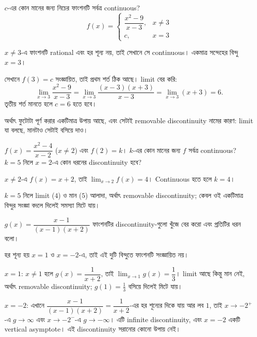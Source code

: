 \documentclass[11pt]{article}
\begin{document}
\begin{example}
$c$-এর কোন মানের জন্য নিচের ফাংশনটি সর্বত্র continuous?
\[
  f(x) = \begin{cases}
    \dfrac{x^{2}-9}{x-3}, & x \neq 3 \\[2mm]
    c, & x = 3
  \end{cases}
\]
\end{example}

\begin{solbox}
$x \neq 3$-এ ফাংশনটি rational এবং হর শূন্য নয়, তাই সেখানে সে continuous।
একমাত্র সন্দেহের বিন্দু $x = 3$।

সেখানে $f(3) = c$ সংজ্ঞায়িত, তাই প্রথম শর্ত ঠিক আছে। limit বের করি:
\[
  \lim_{x \to 3} \frac{x^{2}-9}{x-3}
  = \lim_{x \to 3} \frac{(x-3)(x+3)}{x-3}
  = \lim_{x \to 3} (x+3) = 6 .
\]
তৃতীয় শর্ত মানতে হলে $c = 6$ হতে হবে।

অর্থাৎ ফুটোটা পূর্ণ করার একটিমাত্র উপায় আছে, এবং সেটাই removable discontinuity
নামের কারণ: limit যা বলছে, মানটাও সেটাই বসিয়ে দাও।
\end{solbox}

 $f(x) = \dfrac{x^{2}-4}{x-2}$ ($x \neq 2$) এবং $f(2) = k$। $k$-এর কোন
মানের জন্য $f$ সর্বত্র continuous? $k = 5$ নিলে $x=2$-এ কোন ধরনের
discontinuity হবে?

\begin{sol}
$x \neq 2$-এ $f(x) = x+2$, তাই $\lim_{x \to 2} f(x) = 4$। Continuous হতে হলে
$k = 4$।

$k = 5$ নিলে limit ($4$) ও মান ($5$) আলাদা, অর্থাৎ removable discontinuity;
কেবল ওই একটিমাত্র বিন্দুর সংজ্ঞা বদলে দিলেই সমস্যা মিটে যায়।
\end{sol}

 $g(x) = \dfrac{x-1}{(x-1)(x+2)}$ ফাংশনটির discontinuity-গুলো খুঁজে বের
করো এবং প্রতিটির ধরন বলো।

\begin{sol}
হর শূন্য হয় $x = 1$ ও $x = -2$-এ, তাই এই দুটি বিন্দুতে ফাংশনটি সংজ্ঞায়িত নয়।

$x = 1$: $x \neq 1$ হলে $g(x) = \dfrac{1}{x+2}$, তাই
$\lim_{x \to 1} g(x) = \dfrac{1}{3}$। limit আছে কিন্তু মান নেই, অর্থাৎ
removable discontinuity; $g(1) = \tfrac{1}{3}$ বসিয়ে দিলেই মিটে যায়।

$x = -2$: এখানে $ \dfrac{x-1}{(x-1)(x+2)}=\dfrac{1}{x+2}$-এর হর শূন্যের দিকে যায় আর লব $1$, তাই
$x \to -2^{+}$-এ $g \to \infty$ এবং $x \to -2^{-}$-এ $g \to -\infty$।
এটি infinite discontinuity, এবং $x = -2$ একটি vertical asymptote। এই discontinuity সরানোর কোনো উপায় নেই।
\end{sol}
\end{document}

